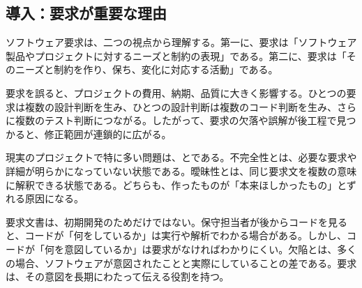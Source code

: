 \subsection*{導入：要求が重要な理由}

ソフトウェア要求は、二つの視点から理解する。第一に、要求は「ソフトウェア製品やプロジェクトに対するニーズと制約の表現」である。第二に、要求は「そのニーズと制約を作り、保ち、変化に対応する活動」である。

要求を誤ると、プロジェクトの費用、納期、品質に大きく影響する。ひとつの要求は複数の設計判断を生み、ひとつの設計判断は複数のコード判断を生み、さらに複数のテスト判断につながる。したがって、要求の欠落や誤解が後工程で見つかると、修正範囲が連鎖的に広がる。

現実のプロジェクトで特に多い問題は、とである。不完全性とは、必要な要求や詳細が明らかになっていない状態である。曖昧性とは、同じ要求文を複数の意味に解釈できる状態である。どちらも、作ったものが「本来ほしかったもの」とずれる原因になる。

要求文書は、初期開発のためだけではない。保守担当者が後からコードを見ると、コードが「何をしているか」は実行や解析でわかる場合がある。しかし、コードが「何を意図しているか」は要求がなければわかりにくい。欠陥とは、多くの場合、ソフトウェアが意図されたことと実際にしていることの差である。要求は、その意図を長期にわたって伝える役割を持つ。

